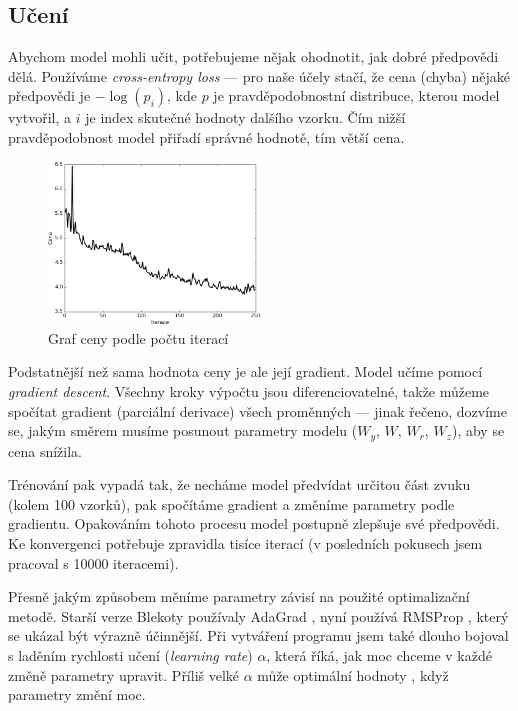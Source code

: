 \documentclass[a4]{article}
\begin{document}
\subsection{Učení}
Abychom model mohli učit, potřebujeme nějak ohodnotit, jak dobré předpovědi dělá. Používáme \textit{cross-entropy loss} --- pro naše účely stačí, že cena (chyba) nějaké předpovědi je $-\log(p_{i})$, kde $p$ je pravděpodobnostní distribuce, kterou model vytvořil, a $i$ je index skutečné hodnoty dalšího vzorku. Čím nižší pravděpodobnost model přiřadí správné hodnotě, tím větší cena.

\begin{figure}
    \centering
    \includegraphics[width=0.5\textwidth]{loss_4}
    \caption{Graf ceny podle počtu iterací}
\end{figure}

Podstatnější než sama hodnota ceny je ale její gradient. Model učíme pomocí \textit{gradient descent}. Všechny kroky výpočtu jsou diferenciovatelné, takže můžeme spočítat gradient (parciální derivace) všech proměnných --- jinak řečeno, dozvíme se, jakým směrem musíme posunout parametry modelu ($W_y$, $W$, $W_r$, $W_z$), aby se cena snížila.

Trénování pak vypadá tak, že necháme model předvídat určitou část zvuku (kolem 100 vzorků), pak spočítáme gradient a změníme parametry podle gradientu. Opakováním tohoto procesu model postupně zlepšuje své předpovědi. Ke konvergenci potřebuje zpravidla tisíce iterací (v posledních pokusech jsem pracoval s 10000 iteracemi).

Přesně jakým způsobem měníme parametry závisí na použité optimalizační metodě. Starší verze Blekoty používaly AdaGrad \cite{adagrad}, nyní používá RMSProp \cite{rmsprop}, který se ukázal být výrazně účinnější. Při vytváření programu jsem také dlouho bojoval s laděním rychlosti učení (\textit{learning rate}) $\alpha$, která říká, jak moc chceme v každé změně parametry upravit. Příliš velké $\alpha$ může optimální hodnoty , když parametry změní moc.
\end{document}
